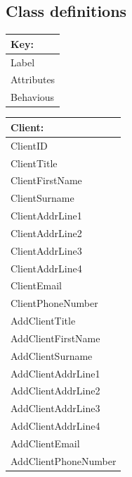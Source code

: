 \subsection{Class definitions} 

\begin{flushleft}

\begin{tabular}{|p{4cm}|}
	\hline
	\textbf{Key:} \\ \hline
	Label \\ \hline
	Attributes \\ \hline	
	Behavious \\ \hline
\end{tabular}


\end{flushleft}


\begin{tabular}{|p{5cm}|}
	\hline
	\textbf{Client:} \\ \hline
		ClientID \\
		ClientTitle \\
		ClientFirstName \\
		ClientSurname \\
		ClientAddrLine1 \\
		ClientAddrLine2 \\
		ClientAddrLine3 \\
		ClientAddrLine4 \\
		ClientEmail \\
		ClientPhoneNumber \\ \hline
		AddClientTitle \\
		AddClientFirstName \\
		AddClientSurname \\
		AddClientAddrLine1 \\
		AddClientAddrLine2 \\
		AddClientAddrLine3 \\
		AddClientAddrLine4 \\
		AddClientEmail \\
		AddClientPhoneNumber \\ \hline
\end{tabular}


